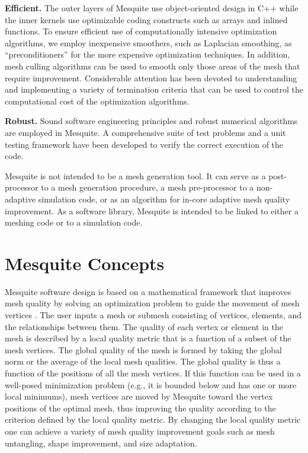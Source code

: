 \documentclass[letter]{report}
\begin{document}
{\bf Efficient.}  The outer layers of Mesquite use 
object-oriented design in C++ while the inner kernels use
optimizable coding constructs such as arrays and inlined
functions.  To ensure efficient use of computationally intensive
optimization algorithms, we employ inexpensive smoothers, such as
Laplacian smoothing, as ``preconditioners'' for the more expensive
optimization techniques.  In addition, mesh culling algorithms can be
used to smooth only those areas of the mesh that require improvement.
Considerable attention has been devoted to understanding and
implementing a variety of termination criteria that can be used to
control the computational cost of the optimization algorithms. \newline

{\bf Robust.} Sound software engineering principles and robust numerical 
algorithms are employed in Mesquite. 
A comprehensive suite of test problems and a unit testing framework have
been developed to verify the correct execution of the code. \newline

Mesquite is not intended to be a mesh generation tool. It can serve as 
a post-processor to a mesh generation procedure, a mesh pre-processor to a 
non-adaptive simulation code, or as an algorithm for in-core adaptive mesh 
quality improvement. As a software library, Mesquite is intended to be
linked to either a meshing code or to a simulation code. \newline

\section{Mesquite Concepts} \label{sec:concepts}

Mesquite software design is based on a mathematical 
framework that improves mesh quality by solving an optimization 
problem to guide the movement of mesh vertices \cite{formal}. 
The user inputs a mesh or 
submesh consisting of vertices, elements, and the relationships between them. 
The quality of each vertex or 
element in the mesh is described by a local quality metric that is a function 
of a subset of the mesh vertices. The global quality of the mesh is formed by 
taking the global norm or the average of the local mesh qualities. The global 
quality is thus a function of the positions of all the mesh vertices. If this 
function can be used in a well-posed minimization problem (e.g., it is 
bounded below and has one or more local minimums), mesh vertices are moved 
by Mesquite toward the vertex positions of the optimal mesh, thus improving 
the quality according to the criterion defined by the local quality metric. 
By changing the local quality metric one can achieve a variety of mesh quality improvement goals such as mesh untangling, shape improvement, and size adaptation. \newline
\end{document}
